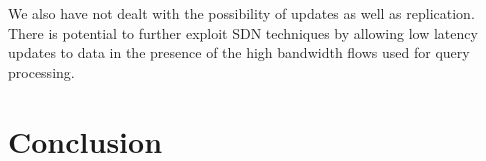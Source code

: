 \documentclass{sig-alternate-2013}
\begin{document}
We also have not dealt with the possibility of updates as well as replication.
There is potential to further exploit SDN techniques by allowing low latency updates to data in the presence of the high bandwidth flows used for query processing.

\section{Conclusion}

\let\theOLDbibliography\thebibliography\renewcommand{\thebibliography}[1]{\theOLDbibliography{#1}%
\item[]\vspace*{0.5mm}}


{\scriptsize

}
\end{document}
